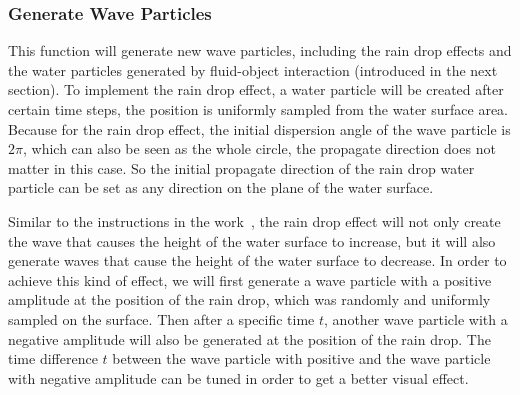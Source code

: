\documentclass[acmtog]{acmart}
\begin{document}
\subsubsection{Generate Wave Particles}
This function will generate new wave particles, including the rain drop effects and the water particles generated by fluid-object interaction (introduced in the next section). 
To implement the rain drop effect, a water particle will be created after certain time steps, the position is uniformly sampled from the water surface area. 
Because for the rain drop effect, the initial dispersion angle of the wave particle is $2\pi$, which can also be seen as the whole circle, the propagate direction does not matter in this case. 
So the initial propagate direction of the rain drop water particle can be set as any direction on the plane of the water surface. 

Similar to the instructions in the work~\cite{yuksel2007wave}, the rain drop effect will not only create the wave that causes the height of the water surface to increase, but it will also generate waves that cause the height of the water surface to decrease. 
In order to achieve this kind of effect, we will first generate a wave particle with a positive amplitude at the position of the rain drop, which was randomly and uniformly sampled on the surface. 
Then after a specific time $t$, another wave particle with a negative amplitude will also be generated at the position of the rain drop. 
The time difference $t$ between the wave particle with positive and the wave particle with negative amplitude can be tuned in order to get a better visual effect. 
\end{document}

